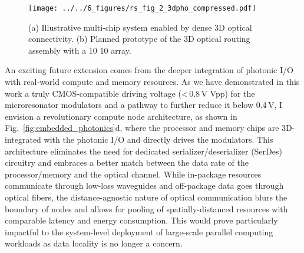 \begin{wrapfigure}{l}{0.39\textwidth}
    \vspace{-1em}
    \begin{center}
        \texttt{[image: ../../6\_figures/rs\_fig\_2\_3dpho\_compressed.pdf]}
    \end{center}
    \caption{(a) Illustrative multi-chip system enabled by dense 3D optical connectivity. (b) Planned prototype of the 3D optical routing assembly with a 10 \texttimes{} 10 array.}
    \label{fig:3d_photonics}
    \vspace{-0.5em}
\end{wrapfigure}

An exciting future extension comes from the deeper integration of photonic I/O with real-world compute and memory resources. As we have demonstrated in this work a truly CMOS-compatible driving voltage (<\,0.8\,V Vpp) for the microresonator modulators and a pathway to further reduce it below 0.4\,V, I envision a revolutionary compute node architecture, as shown in Fig.~\ref{fig:embedded_photonics}d, where the processor and memory chips are 3D-integrated with the photonic I/O and directly drives the modulators. This architecture eliminates the need for dedicated serializer/deserializer (SerDes) circuitry and embraces a better match between the data rate of the processor/memory and the optical channel. While in-package resources communicate through low-loss waveguides and off-package data goes through optical fibers, the distance-agnostic nature of optical communication blurs the boundary of nodes and allows for pooling of spatially-distanced resources with comparable latency and energy consumption. This would prove particularly impactful to the system-level deployment of large-scale parallel computing workloads as data locality is no longer a concern.

